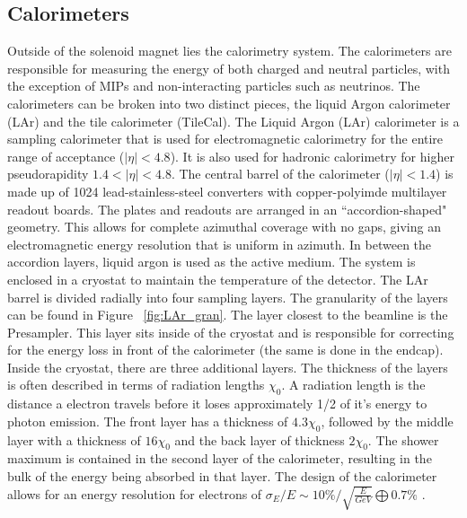 \subsection{Calorimeters}\label{ssec:calo}




Outside of the solenoid magnet lies the calorimetry system. The calorimeters are responsible for measuring the energy of both charged and neutral particles, with the exception of MIPs and non-interacting particles such as neutrinos. The calorimeters can be broken into two distinct pieces, the liquid Argon calorimeter (LAr)\cite{CERN-LHCC-96-041} and the tile calorimeter (TileCal)\cite{CERN-LHCC-96-042}. \newline
\indent The Liquid Argon (LAr) calorimeter is a sampling calorimeter that is used for electromagnetic calorimetry for the entire range of acceptance (${|\eta{}|<4.8}$). It is also used for hadronic calorimetry for higher pseudorapidity ${1.4<|\eta{}|<4.8}$. The central barrel of the calorimeter (${|\eta{}| < 1.4}$) is made up of 1024 lead-stainless-steel converters with copper-polyimde multilayer readout boards. The plates and readouts are arranged in an ``accordion-shaped" geometry. This allows for complete azimuthal coverage with no gaps, giving an electromagnetic energy resolution that is uniform in azimuth. In between the accordion layers, liquid argon is used as the active medium. The system is enclosed in a cryostat to maintain the temperature of the detector. The LAr barrel is divided radially into four sampling layers. The granularity of the layers can be found in Figure ~\ref{fig:LAr_gran}. The layer closest to the beamline is the Presampler. This layer sits inside of the cryostat and is responsible for  correcting for the energy loss in front of the calorimeter (the same is done in the endcap). Inside the cryostat, there are three additional layers. The thickness of the layers is often described in terms of radiation lengths ${\chi_{0}}$. A radiation length is the distance a electron travels before it loses approximately 1/2 of it's energy to photon emission.  The front layer has a thickness of ${4.3\chi_{0}}$, followed by the middle layer with a thickness of ${16\chi_{0}}$ and the back layer of thickness ${2\chi_{0}}$. The shower maximum is contained in the second layer of the calorimeter, resulting in the bulk of the energy being absorbed in that layer. The design of the calorimeter allows for an energy resolution for electrons of ${\sigma_{E}/E \sim 10\%/\sqrt{\frac{E}{GeV}} \bigoplus 0.7\%}$ \cite{Aad:2014nim}.\newline 

